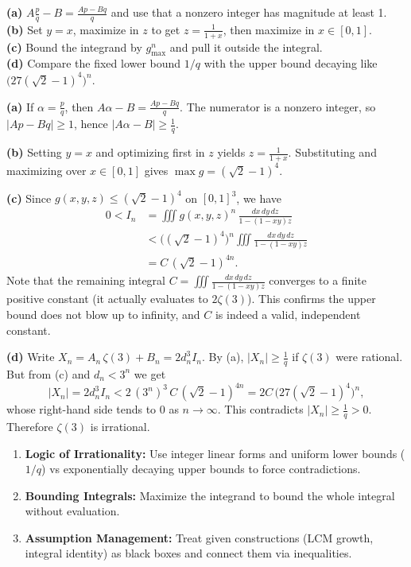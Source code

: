 \begin{hint}
	\textbf{(a)} $A\frac{p}{q}-B=\frac{Ap-Bq}{q}$ and use that a nonzero integer has magnitude at least 1.\\
	\textbf{(b)} Set $y=x$, maximize in $z$ to get $z=\frac{1}{1+x}$, then maximize in $x\in[0,1]$.\\
	\textbf{(c)} Bound the integrand by $g_{\max}^n$ and pull it outside the integral.\\
	\textbf{(d)} Compare the fixed lower bound $1/q$ with the upper bound decaying like $\big(27(\sqrt{2}-1)^4\big)^n$.
\end{hint}


\begin{solution}
	\textbf{(a)} If $\alpha=\tfrac{p}{q}$, then $A\alpha-B=\tfrac{Ap-Bq}{q}$. The numerator is a nonzero integer, so $|Ap-Bq|\ge 1$, hence $|A\alpha-B|\ge \tfrac{1}{q}$.

	\textbf{(b)} Setting $y=x$ and optimizing first in $z$ yields $z=\tfrac{1}{1+x}$. Substituting and maximizing over $x\in[0,1]$ gives $\max g=(\sqrt{2}-1)^4$.

	\textbf{(c)} Since $g(x,y,z)\le (\sqrt{2}-1)^4$ on $[0,1]^3$, we have
\begin{align*}
0 < I_n &= \iiint g(x,y,z)^n\,\frac{dx\,dy\,dz}{1-(1-xy)z} \\
    &< \big((\sqrt{2}-1)^4\big)^n \iiint \frac{dx\,dy\,dz}{1-(1-xy)z} \\
    &= C\,(\sqrt{2}-1)^{4n}.
\end{align*}
Note that the remaining integral $C = \iiint \frac{dx\,dy\,dz}{1-(1-xy)z}$ converges to a finite positive constant (it actually evaluates to $2\zeta(3)$). This confirms the upper bound does not blow up to infinity, and $C$ is indeed a valid, independent constant.

	\textbf{(d)} Write $X_n=A_n\,\zeta(3)+B_n=2d_n^3 I_n$. By (a), $|X_n|\ge \tfrac{1}{q}$ if $\zeta(3)$ were rational. But from (c) and $d_n<3^n$ we get
\[ |X_n|=2d_n^3 I_n < 2\,(3^n)^3\,C\,(\sqrt{2}-1)^{4n} = 2C\,\big(27(\sqrt{2}-1)^4\big)^n, \]
whose right-hand side tends to $0$ as $n\to\infty$. This contradicts $|X_n|\ge \tfrac{1}{q}>0$. Therefore $\zeta(3)$ is irrational.
\end{solution}

\begin{takeaways}
\begin{enumerate}
    \item \textbf{Logic of Irrationality:} Use integer linear forms and uniform lower bounds ($1/q$) vs exponentially decaying upper bounds to force contradictions.
    \item \textbf{Bounding Integrals:} Maximize the integrand to bound the whole integral without evaluation.
    \item \textbf{Assumption Management:} Treat given constructions (LCM growth, integral identity) as black boxes and connect them via inequalities.
\end{enumerate}
\end{takeaways}

